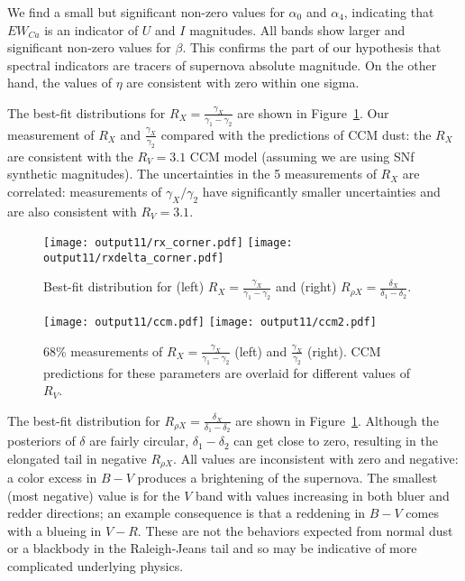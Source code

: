 \documentclass[11pt, oneside]{article}   	%
\begin{document}
We find a small but significant non-zero values for $\alpha_0$ and $\alpha_4$, indicating that $EW_{Ca}$ is an indicator of $U$ and $I$
magnitudes.  All bands show larger and significant non-zero values for $\beta$.  This confirms the part of our hypothesis that spectral indicators
are tracers of supernova absolute magnitude.  On the other hand, the values of $\eta$ are consistent with zero within one sigma.

The best-fit distributions for $R_X=\frac{\gamma_X}{\gamma_1-\gamma_2}$ are shown in Figure~\ref{rx:fig}.  Our measurement of
$R_X$ and $\frac{\gamma_X}{\gamma_2}$  compared with the predictions of CCM dust:
the $R_X$ are consistent with the  $R_V=3.1$ CCM model (assuming we are using
SNf synthetic magnitudes).  The uncertainties in the 5 measurements
of $R_X$ are correlated: measurements of $\gamma_X/\gamma_2$ have significantly smaller
uncertainties and are also consistent with $R_V=3.1$.

\begin{figure}[htbp] %
   \centering
   \texttt{[image: output11/rx\_corner.pdf]}
      \texttt{[image: output11/rxdelta\_corner.pdf]} 
   \caption{Best-fit distribution for (left)  $R_X=\frac{\gamma_X}{\gamma_1-\gamma_2}$ and (right)  $R_{\rho X}=\frac{\delta_X}{\delta_1-\delta_2}$.
   \label{rx:fig}}
\end{figure}

\begin{figure}[htbp] %
   \centering
   \texttt{[image: output11/ccm.pdf]}
      \texttt{[image: output11/ccm2.pdf]} 
   \caption{68\% measurements of $R_X=\frac{\gamma_X}{\gamma_1-\gamma_2}$ (left) and $\frac{\gamma_X}{\gamma_2}$ (right).  CCM
   predictions for these parameters are overlaid for different values of $R_V$.
   \label{ccm:fig}}
\end{figure}

The best-fit distribution for $R_{\rho X}=\frac{\delta_X}{\delta_1-\delta_2}$ are shown in Figure~\ref{rx:fig}.
Although the posteriors of $\delta$ are fairly circular, $\delta_1-\delta_2$ can get close to zero, resulting in the
elongated tail in negative  $R_{\rho X}$.
All values are inconsistent with zero and negative: a color excess in $B-V$ produces a brightening of the supernova.
The smallest (most negative) value is for the $V$ band with  values increasing in both bluer and redder directions; an
example consequence is that
a reddening in $B-V$ comes with a blueing in $V-R$.
These are not the behaviors expected from normal dust or a blackbody in the Raleigh-Jeans tail and so may be indicative of
more complicated underlying physics.
\end{document}

